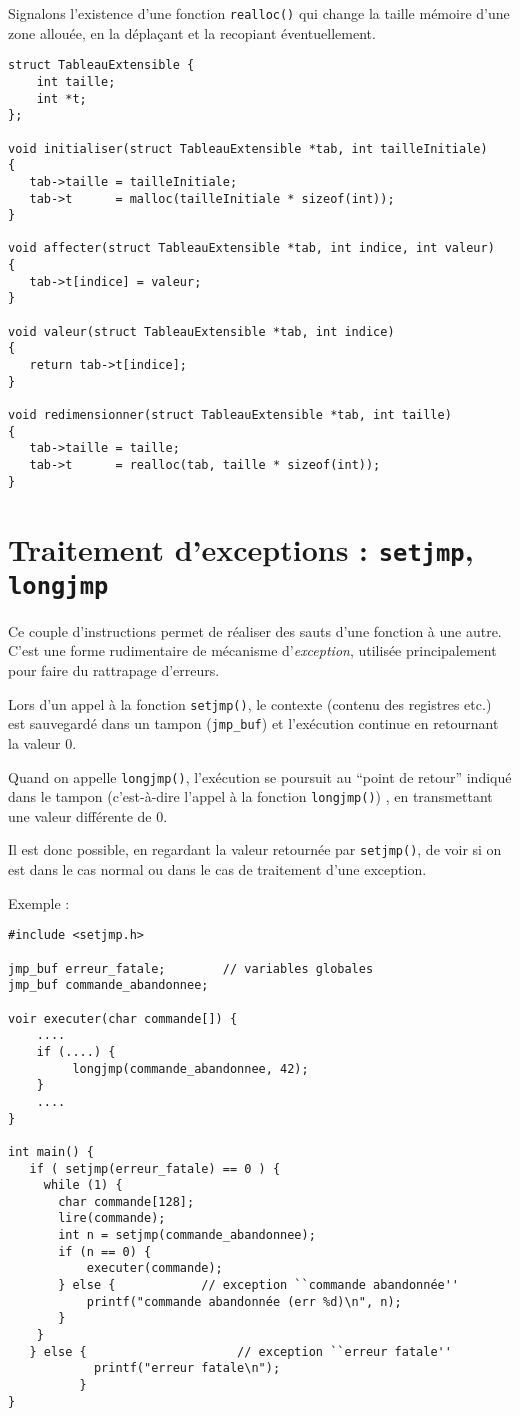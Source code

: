 \documentclass[10pt]{article}
\begin{document}
Signalons l'existence d'une fonction \texttt{realloc()} qui change la taille mémoire d'une zone
allouée, en la déplaçant et la recopiant éventuellement.

\begin{lstlisting}
struct TableauExtensible {
    int taille;
    int *t;
};

void initialiser(struct TableauExtensible *tab, int tailleInitiale)
{
   tab->taille = tailleInitiale;
   tab->t      = malloc(tailleInitiale * sizeof(int));
}

void affecter(struct TableauExtensible *tab, int indice, int valeur)
{
   tab->t[indice] = valeur;
}

void valeur(struct TableauExtensible *tab, int indice)
{
   return tab->t[indice];
}

void redimensionner(struct TableauExtensible *tab, int taille)
{
   tab->taille = taille;
   tab->t      = realloc(tab, taille * sizeof(int));
}
\end{lstlisting}


\section{Traitement d'exceptions : \texttt{setjmp}, \texttt{longjmp}}

Ce couple d'instructions permet de réaliser des sauts d'une fonction
à une autre. C'est une forme rudimentaire de mécanisme d'\emph{exception},
utilisée principalement pour faire du rattrapage d'erreurs.


Lors d'un appel à la fonction \texttt{setjmp()}, le contexte (contenu
des registres etc.) est sauvegardé dans un tampon (\texttt{jmp\_buf})
et l'exécution continue en retournant la valeur 0.

Quand on appelle \texttt{longjmp()}, l'exécution se poursuit au
``point de retour'' indiqué dans le tampon (c'est-à-dire l'appel à la
fonction \texttt{longjmp()}) , en transmettant une valeur différente
de 0.

Il est donc possible, en regardant la valeur retournée par
\texttt{setjmp()}, de voir si on est dans le cas normal ou dans le cas
de traitement d'une exception.

Exemple :

\begin{lstlisting}
#include <setjmp.h>

jmp_buf erreur_fatale;        // variables globales
jmp_buf commande_abandonnee;

voir executer(char commande[]) {
    ....
    if (....) {
         longjmp(commande_abandonnee, 42);
    }
    ....
}

int main() {
   if ( setjmp(erreur_fatale) == 0 ) {
     while (1) {
       char commande[128];
       lire(commande);
       int n = setjmp(commande_abandonnee);
       if (n == 0) {                
           executer(commande);
       } else {            // exception ``commande abandonnée''
           printf("commande abandonnée (err %d)\n", n);
       }
    }
   } else {                     // exception ``erreur fatale''
            printf("erreur fatale\n");
          }
}
\end{lstlisting}
\end{document}
